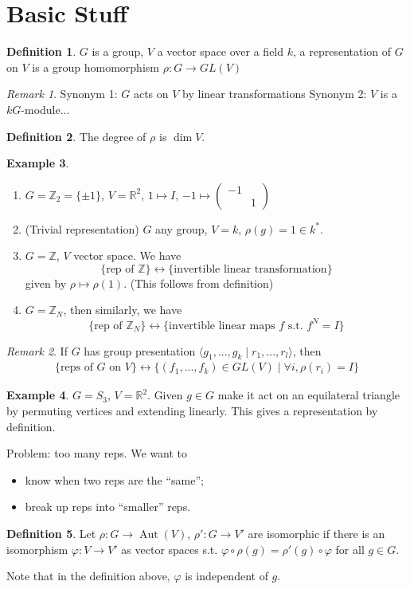 \documentclass{article}
\theoremstyle{definition}
\newtheorem{defn}{Definition}[section]
\newtheorem{example}[defn]{Example}
\theoremstyle{remark}
\newtheorem{rem}{Remark}
\theoremstyle{plain}
\newcommand{\ZZ}{\mathbb{Z}}
\newcommand{\RR}{\mathbb{R}}
\begin{document}
\section{Basic Stuff}
\begin{defn}
    $G$ is a group, $V$ a vector space over a field $k$, a representation of $G$ on $V$ is a group homomorphism $\rho:G\to GL(V)$
\end{defn}
\begin{rem}
    Synonym 1: $G$ acts on $V$ by linear transformations
    Synonym 2: $V$ is a $kG$-module...
\end{rem}
\begin{defn}
    The degree of $\rho$ is $\dim V$.
\end{defn}
\begin{example}
\begin{enumerate}
    \item $G=\ZZ_2=\{\pm 1\}$, $V=\RR^2$, $1\mapsto I$, $-1\mapsto \begin{pmatrix}
        -1&\\
        &1
    \end{pmatrix}$
    \item (Trivial representation) $G$ any group, $V=k$, $\rho(g)=1\in k^\ast$.
    \item $G=\ZZ$, $V$ vector space. We have 
    \[\{\text{rep of }\ZZ\}\leftrightarrow\{\text{invertible linear transformation}\}\]
    given by $\rho\mapsto \rho(1)$. (This follows from definition)
    \item $G=\ZZ_N$, then similarly, we have
    \[\{\text{rep of }\ZZ_N\}\leftrightarrow\{\text{invertible linear maps }f\text{ s.t. }f^N=I\}\]
\end{enumerate}
\end{example}
\begin{rem}
    If $G$ has group presentation $\langle g_1,...,g_k\mid r_1,...,r_l\rangle$, then
    \begin{align*}
        \{\text{reps of }G\text{ on }V\}\leftrightarrow\{(f_1,...,f_k)\in GL(V)\mid \forall i,\rho(r_i)=I\}
    \end{align*}
\end{rem}
\begin{example}
    $G=S_3$, $V=\RR^2$. Given $g\in G$ make it act on an equilateral triangle by permuting vertices and extending linearly. This gives a representation by definition.
\end{example}

Problem: too many reps. We want to
\begin{itemize}
    \item know when two reps are the ``same'';
    \item break up reps into ``smaller'' reps.
\end{itemize}
\begin{defn}
    Let $\rho:G\to\operatorname{Aut}(V)$, $\rho':G\to V'$ are isomorphic if there is an isomorphism $\varphi:V\to V'$ as vector spaces s.t. $\varphi\circ\rho(g)=\rho'(g)\circ\varphi$ for all $g\in G$.
\end{defn}
Note that in the definition above, $\varphi$ is independent of $g$.
\end{document}

